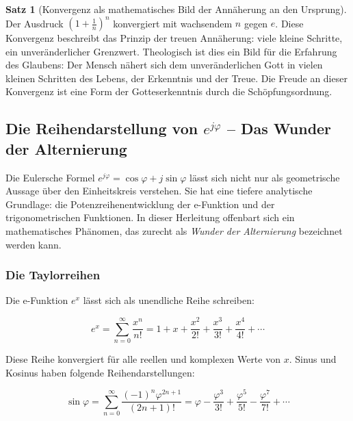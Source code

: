 ﻿\documentclass[a4paper,12pt]{article}
\theoremstyle{definition}
\newtheorem{theorem}{Satz}[section]
\begin{document}
\begin{theorem}[Konvergenz als mathematisches Bild der Annäherung an den Ursprung]
	Der Ausdruck $\left(1+\frac{1}{n}\right)^n$ konvergiert mit wachsendem $n$
	gegen $e$. Diese Konvergenz beschreibt das Prinzip der treuen Annäherung:
	viele kleine Schritte, ein unveränderlicher Grenzwert. Theologisch ist dies
	ein Bild für die Erfahrung des Glaubens: Der Mensch nähert sich dem unveränderlichen
	Gott in vielen kleinen Schritten des Lebens, der Erkenntnis und der Treue.
	Die Freude an dieser Konvergenz ist eine Form der Gotteserkenntnis durch die
	Schöpfungsordnung.
\end{theorem}

\subsection{Die Reihendarstellung von $e^{j\varphi}$ -- Das Wunder der Alternierung}

Die Eulersche Formel $e^{j\varphi} = \cos\varphi + j\sin\varphi$ lässt sich
nicht nur als geometrische Aussage über den Einheitskreis verstehen. Sie hat eine
tiefere analytische Grundlage: die Potenzreihenentwicklung der e-Funktion
und der trigonometrischen Funktionen. In dieser Herleitung offenbart sich ein
mathematisches Phänomen, das zurecht als \textit{Wunder der Alternierung} bezeichnet
werden kann.

\subsubsection{Die Taylorreihen}

Die e-Funktion $e^x$ lässt sich als unendliche Reihe schreiben:

\begin{equation}
	e^x = \sum_{n=0}^{\infty} \frac{x^n}{n!}
	= 1 + x + \frac{x^2}{2!} + \frac{x^3}{3!} + \frac{x^4}{4!} + \cdots
\end{equation}

Diese Reihe konvergiert für alle reellen und komplexen Werte von $x$.
Sinus und Kosinus haben folgende Reihendarstellungen:

\begin{equation}
	\sin\varphi = \sum_{n=0}^{\infty} \frac{(-1)^n \varphi^{2n+1}}{(2n+1)!}
	= \varphi - \frac{\varphi^3}{3!} + \frac{\varphi^5}{5!} - \frac{\varphi^7}{7!} + \cdots
\end{equation}
\end{document}
